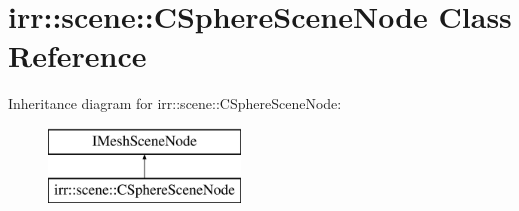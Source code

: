 \hypertarget{classirr_1_1scene_1_1_c_sphere_scene_node}{\section{irr\-:\-:scene\-:\-:C\-Sphere\-Scene\-Node Class Reference}
\label{classirr_1_1scene_1_1_c_sphere_scene_node}
}
Inheritance diagram for irr\-:\-:scene\-:\-:C\-Sphere\-Scene\-Node\-:\begin{figure}[H]
\begin{center}
\leavevmode
\includegraphics[height=2.000000cm]{classirr_1_1scene_1_1_c_sphere_scene_node}
\end{center}
\end{figure}
